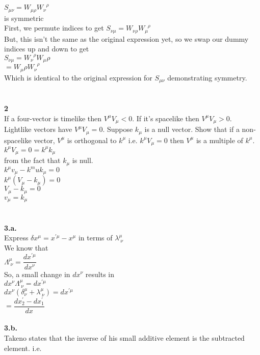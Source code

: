 \documentclass[prb,preprint]
{revtex4-1}
\newcommand{\PRLsep}{\noindent\makebox[\linewidth]{\resizebox{0.8888\linewidth}{2pt}{$\bullet$}}\bigskip}
\begin{document}
\\
$S_{\mu\nu} = W_{\mu\rho}W_\nu^{\;\;\rho}$
\\
is symmetric
\\
First, we permute indices to get
$S_{\nu\mu} = W_{\nu\rho}W_\mu^{\;\;\rho}$
\\
But, this isn't the same as the original expression yet, so we swap our dummy indices up and down to get 
\\
$S_{\nu\mu} = W_{\nu}^{\;\;\rho}W_\mu\rho$
\\
$= W_\mu\rho W_{\nu}^{\;\;\rho}$
\\
Which is identical to the original expression for $S_{\mu\nu}$ demonstrating symmetry.
\\
\PRLsep
\\
\\
\textbf{2}
\\
If a four-vector is timelike then $V^\mu V_\mu < 0$.  If it's spacelike then $V^\mu V_\mu > 0 $.  Lightlike vectors have $V^\mu V_\mu = 0$.  Suppose $k_\mu$ is a null vector.  Show that if a non-spacelike vector, $V^\mu$ is orthogonal to $k^\mu$ i.e. $k^\mu V_\mu = 0$ then $V^\mu$ is a multiple of $k^\mu$.
\\
$k^\mu V_\mu = 0 = k^\mu k_\mu$
\\
from the fact that $k_\mu$ is null.
\\
$k^\mu v_\mu - k^mu k_\mu = 0$
\\
$k^\mu\left(V_\mu - k_\mu\right) = 0$
\\
$V_\mu - k_\mu = 0$
\\
$v_\mu = k_\mu$
\\
\\
\PRLsep
\\
\textbf{3.a.}
\\
Express $\delta x^\mu = x^{\prime\mu} - x^\mu$ in terms of $\lambda^\mu_{\;\nu}$
\\
We know that 
\\
$\Lambda^\mu_{\;\nu} = \dfrac{dx^{\prime\mu}}{dx^\nu}$
\\
So, a small change in $dx^\nu$ results in 
\\
$dx^\nu \Lambda^\mu_{\;\nu} = dx^{\prime \mu}$
\\
$dx^\nu\left(\delta^\mu_\nu + \lambda^\mu_{\;\nu}\right) = dx^{\prime\mu}$
\\
$ = \dfrac{dx^\prime_2 - dx^\prime_1}{dx}$
\\
\\
\textbf{3.b.}
\\
Takeno states that the inverse of his small additive element is the subtracted element.  i.e.
\end{document}
